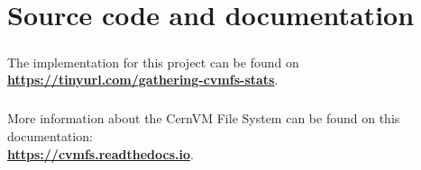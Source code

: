 \chapter{Source code and documentation}
\paragraph{}The implementation for this project can be found on \\ \textbf{\href{https://github.com/cvmfs/cvmfs/pulls?q=is\%3Apr+author\%3Adosarudaniel+is\%3Aclosed}{https://tinyurl.com/gathering-cvmfs-stats}}.
\paragraph{}
More information about the CernVM File System can be found on this documentation:\\
\textbf{\href{https://cvmfs.readthedocs.io/en/stable/}{https://cvmfs.readthedocs.io}}.
 

